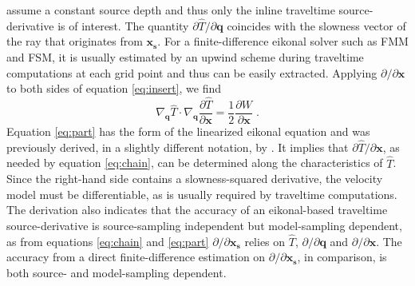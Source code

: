 assume a constant source depth and thus only the inline traveltime source-derivative is of interest. 
The quantity $\partial \hat{T} / \partial \mathbf{q}$ coincides with the slowness vector of the 
ray that originates from $\mathbf{x_s}$. For a finite-difference eikonal solver such as FMM and 
FSM, it is usually estimated by an upwind scheme during traveltime computations at each grid point 
and thus can be easily extracted. Applying $\partial / \partial \mathbf{x}$ to both sides of 
equation \ref{eq:insert}, we find 
\begin{equation}
\label{eq:part}
\nabla_{\mathbf{q}} \hat{T} \cdot 
\nabla_{\mathbf{q}} \frac{\partial \hat{T}}{\partial \mathbf{x}} 
= \frac{1}{2} \frac{\partial W}{\partial \mathbf{x}}\;.
\end{equation}
Equation \ref{eq:part} has the form of the linearized eikonal equation \cite[]{aldridge} and was 
previously derived, in a slightly different notation, by \cite{alkhalifah3}. It implies that 
$\partial \hat{T} / \partial \mathbf{x}$, as needed by equation \ref{eq:chain}, can be determined 
along the characteristics of $\hat{T}$. Since the right-hand side contains a slowness-squared 
derivative, the velocity model must be differentiable, as is usually required by traveltime 
computations. The derivation also indicates that the accuracy of an eikonal-based traveltime 
source-derivative is source-sampling independent but model-sampling dependent, as from equations 
\ref{eq:chain} and \ref{eq:part} $\partial / \partial \mathbf{x_s}$ relies on 
$\hat{T}$, $\partial / \partial \mathbf{q}$ and $\partial / \partial \mathbf{x}$. The accuracy 
from a direct finite-difference estimation on $\partial / \partial \mathbf{x_s}$, in comparison, 
is both source- and model-sampling dependent.

